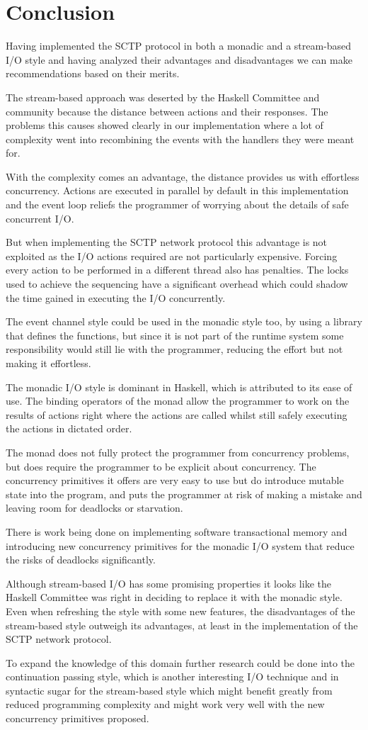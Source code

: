 \chapter{Conclusion}
Having implemented the SCTP protocol in both a monadic and a stream-based I/O style and having analyzed their advantages and disadvantages we can make recommendations based on their merits.

The stream-based approach was deserted by the Haskell Committee and community because the distance between actions and their responses. The problems this causes showed clearly in our implementation where a lot of complexity went into recombining the events with the handlers they were meant for. 

With the complexity comes an advantage, the distance provides us with effortless concurrency. Actions are executed in parallel by default in this implementation and the event loop reliefs the programmer of worrying about the details of safe concurrent I/O. 

But when implementing the SCTP network protocol this advantage is not exploited as the I/O actions required are not particularly expensive.
Forcing every action to be performed in a different thread also has penalties. The locks used to achieve the sequencing have a significant overhead which could shadow the time gained in executing the I/O concurrently.

The event channel style could be used in the monadic style too, by using a library that defines the functions, but since it is not part of the runtime system some responsibility would still lie with the programmer, reducing the effort but not making it effortless.

The monadic I/O style is dominant in Haskell, which is attributed to its ease of use. The binding operators of the monad allow the programmer to work on the results of actions right where the actions are called whilst still safely executing the actions in dictated order.

The monad does not fully protect the programmer from concurrency problems, but does require the programmer to be explicit about concurrency.
	The concurrency primitives it offers are very easy to use but do introduce mutable state into the program, and puts the programmer at risk of making a mistake and leaving room for deadlocks or starvation.

There is work being done on implementing software transactional memory and introducing new concurrency primitives for the monadic I/O system that reduce the risks of deadlocks significantly.

Although stream-based I/O has some promising properties it looks like the Haskell Committee was right in deciding to replace it with the monadic style. Even when refreshing the style with some new features, the disadvantages of the stream-based style outweigh its advantages, at least in the implementation of the SCTP network protocol.

To expand the knowledge of this domain further research could be done into the continuation passing style, which is another interesting I/O technique and in syntactic sugar for the stream-based style which might benefit greatly from reduced programming complexity and might work very well with the new concurrency primitives proposed.
